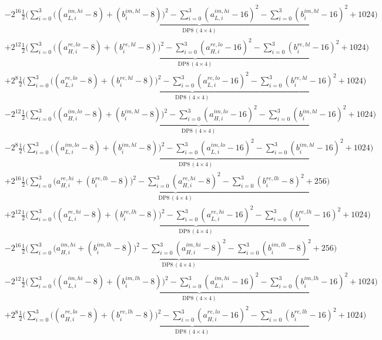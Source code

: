 \documentclass[fleqn]{article}
\newcommand{\DPop}[3]{\mathrm{DP#1}\,(#2\!\times\!#3)}
\begin{document}
\begin{align*}
  & - 2^{16}\underbrace{\tfrac12\Big(\sum_{i=0}^{3}\big((a_{L,i}^{im,hi}{-}8){+}(b_i^{im,hl}{-}8)\big)^2 - \sum_{i=0}^{3}(a_{L,i}^{im,hi}{-}16)^2 - \sum_{i=0}^{3}(b_i^{im,hl}{-}16)^2 + 1024\Big)}_{\DPop{8}{4}{4}} \\[0.35em]
  & + 2^{12}\underbrace{\tfrac12\Big(\sum_{i=0}^{3}\big((a_{H,i}^{re,lo}{-}8){+}(b_i^{re,hl}{-}8)\big)^2 - \sum_{i=0}^{3}(a_{H,i}^{re,lo}{-}16)^2 - \sum_{i=0}^{3}(b_i^{re,hl}{-}16)^2 + 1024\Big)}_{\DPop{8}{4}{4}} \\[0.35em]
  & + 2^{8}\underbrace{\tfrac12\Big(\sum_{i=0}^{3}\big((a_{L,i}^{re,lo}{-}8){+}(b_i^{re,hl}{-}8)\big)^2 - \sum_{i=0}^{3}(a_{L,i}^{re,lo}{-}16)^2 - \sum_{i=0}^{3}(b_i^{re,hl}{-}16)^2 + 1024\Big)}_{\DPop{8}{4}{4}} \\[0.35em]
  & - 2^{12}\underbrace{\tfrac12\Big(\sum_{i=0}^{3}\big((a_{H,i}^{im,lo}{-}8){+}(b_i^{im,hl}{-}8)\big)^2 - \sum_{i=0}^{3}(a_{H,i}^{im,lo}{-}16)^2 - \sum_{i=0}^{3}(b_i^{im,hl}{-}16)^2 + 1024\Big)}_{\DPop{8}{4}{4}} \\[0.35em]
  & - 2^{8}\underbrace{\tfrac12\Big(\sum_{i=0}^{3}\big((a_{L,i}^{im,lo}{-}8){+}(b_i^{im,hl}{-}8)\big)^2 - \sum_{i=0}^{3}(a_{L,i}^{im,lo}{-}16)^2 - \sum_{i=0}^{3}(b_i^{im,hl}{-}16)^2 + 1024\Big)}_{\DPop{8}{4}{4}} \\[0.35em]
  & + 2^{16}\underbrace{\tfrac12\Big(\sum_{i=0}^{3}\big(a_{H,i}^{re,hi}{+}(b_i^{re,lh}{-}8)\big)^2 - \sum_{i=0}^{3}(a_{H,i}^{re,hi}{-}8)^2 - \sum_{i=0}^{3}(b_i^{re,lh}{-}8)^2 + 256\Big)}_{\DPop{8}{4}{4}} \\[0.35em]
  & + 2^{12}\underbrace{\tfrac12\Big(\sum_{i=0}^{3}\big((a_{L,i}^{re,hi}{-}8){+}(b_i^{re,lh}{-}8)\big)^2 - \sum_{i=0}^{3}(a_{L,i}^{re,hi}{-}16)^2 - \sum_{i=0}^{3}(b_i^{re,lh}{-}16)^2 + 1024\Big)}_{\DPop{8}{4}{4}} \\[0.35em]
  & - 2^{16}\underbrace{\tfrac12\Big(\sum_{i=0}^{3}\big(a_{H,i}^{im,hi}{+}(b_i^{im,lh}{-}8)\big)^2 - \sum_{i=0}^{3}(a_{H,i}^{im,hi}{-}8)^2 - \sum_{i=0}^{3}(b_i^{im,lh}{-}8)^2 + 256\Big)}_{\DPop{8}{4}{4}} \\[0.35em]
  & - 2^{12}\underbrace{\tfrac12\Big(\sum_{i=0}^{3}\big((a_{L,i}^{im,hi}{-}8){+}(b_i^{im,lh}{-}8)\big)^2 - \sum_{i=0}^{3}(a_{L,i}^{im,hi}{-}16)^2 - \sum_{i=0}^{3}(b_i^{im,lh}{-}16)^2 + 1024\Big)}_{\DPop{8}{4}{4}} \\[0.35em]
  & + 2^{8}\underbrace{\tfrac12\Big(\sum_{i=0}^{3}\big((a_{H,i}^{re,lo}{-}8){+}(b_i^{re,lh}{-}8)\big)^2 - \sum_{i=0}^{3}(a_{H,i}^{re,lo}{-}16)^2 - \sum_{i=0}^{3}(b_i^{re,lh}{-}16)^2 + 1024\Big)}_{\DPop{8}{4}{4}} \\[0.35em]

\end{align*}
\end{document}
